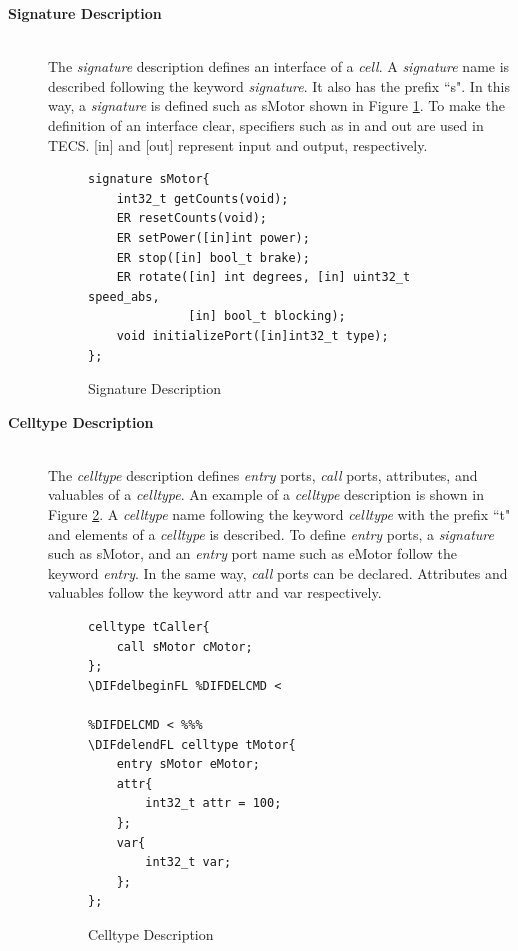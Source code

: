 \documentclass[conference,compsoc]{IEEEtran}
\providecommand{\DIFdelbeginFL}{} %
\providecommand{\DIFdelendFL}{} %
\begin{document}
\begin{description}
    \item[{\bf Signature Description}]\mbox{}\\
        The {\it signature} description defines an interface of a {\it cell}.
        A {\it signature} name is described following the keyword {\it signature}.
        It also has the prefix ``s".
        In this way, a {\it signature} is defined such as sMotor shown in Figure \ref{signature}.
        To make the definition of an interface clear, specifiers such as in and out are used in TECS.
        [in] and [out] represent input and output, respectively.\\
\begin{figure}[t]
\centering
\begin{lstlisting}
signature sMotor{
    int32_t getCounts(void);
    ER resetCounts(void);
    ER setPower([in]int power);
    ER stop([in] bool_t brake);
    ER rotate([in] int degrees, [in] uint32_t speed_abs,
              [in] bool_t blocking);
    void initializePort([in]int32_t type);
};
\end{lstlisting}
\caption{Signature Description}
\label{signature}
\end{figure}

    \item[{\bf Celltype Description}]\mbox{}\\
        The {\it celltype} description defines {\it entry} ports, {\it call} ports, attributes, and valuables of a {\it celltype}.
        An example of a {\it celltype} description is shown in Figure \ref{celltype}.
        A {\it celltype} name following the keyword {\it celltype} with the prefix ``t" and elements of a {\it celltype} is described.
        To define {\it entry} ports, a {\it signature} such as sMotor, and an {\it entry} port name such as eMotor follow the keyword {\it entry}.
        In the same way, {\it call} ports can be declared.
        Attributes and valuables follow the keyword attr and var respectively.\\
\begin{figure}[t]
\centering
\begin{lstlisting}
celltype tCaller{
    call sMotor cMotor;
};
\DIFdelbeginFL %DIFDELCMD < 

%DIFDELCMD < %%%
\DIFdelendFL celltype tMotor{
    entry sMotor eMotor;
    attr{
        int32_t attr = 100;
    };
    var{
        int32_t var;
    };
};
\end{lstlisting}
\caption{Celltype Description}
\label{celltype}
\end{figure}


\end{description}
\end{document}
